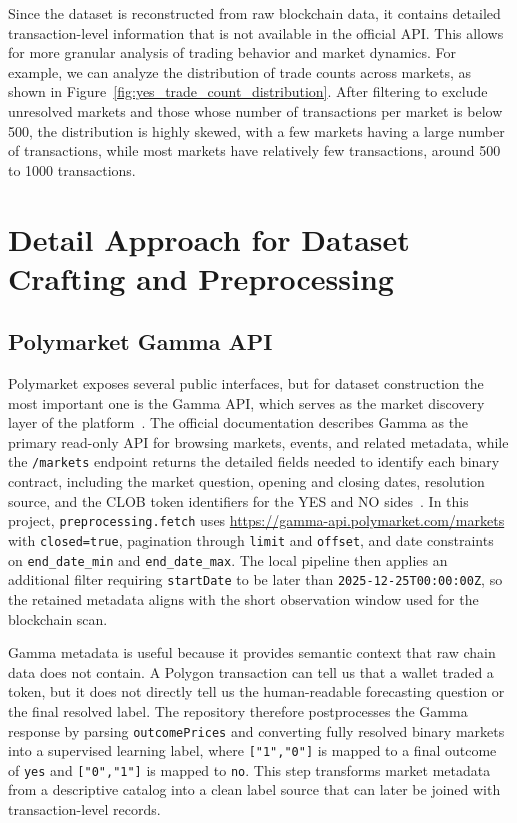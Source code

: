 \documentclass[11pt]{article}
\begin{document}
Since the dataset is reconstructed from raw blockchain data, it contains detailed transaction-level information that is not available in the official API. This allows for more granular analysis of trading behavior and market dynamics. For example, we can analyze the distribution of trade counts across markets, as shown in Figure~\ref{fig:yes_trade_count_distribution}. After filtering to exclude unresolved markets and those whose number of transactions per market is below 500, the distribution is highly skewed, with a few markets having a large number of transactions, while most markets have relatively few transactions, around 500 to 1000 transactions.

\section{Detail Approach for Dataset Crafting and Preprocessing}

\subsection{Polymarket Gamma API}

Polymarket exposes several public interfaces, but for dataset construction the most important one is the Gamma API, which serves as the market discovery layer of the platform~\cite{polymarketApiIntroduction}. The official documentation describes Gamma as the primary read-only API for browsing markets, events, and related metadata, while the \texttt{/markets} endpoint returns the detailed fields needed to identify each binary contract, including the market question, opening and closing dates, resolution source, and the CLOB token identifiers for the YES and NO sides~\cite{polymarketApiIntroduction, polymarketListMarkets}. In this project, \texttt{preprocessing.fetch} uses \url{https://gamma-api.polymarket.com/markets} with \texttt{closed=true}, pagination through \texttt{limit} and \texttt{offset}, and date constraints on \texttt{end\_date\_min} and \texttt{end\_date\_max}. The local pipeline then applies an additional filter requiring \texttt{startDate} to be later than \texttt{2025-12-25T00:00:00Z}, so the retained metadata aligns with the short observation window used for the blockchain scan.

Gamma metadata is useful because it provides semantic context that raw chain data does not contain. A Polygon transaction can tell us that a wallet traded a token, but it does not directly tell us the human-readable forecasting question or the final resolved label. The repository therefore postprocesses the Gamma response by parsing \texttt{outcomePrices} and converting fully resolved binary markets into a supervised learning label, where \texttt{["1","0"]} is mapped to a final outcome of \texttt{yes} and \texttt{["0","1"]} is mapped to \texttt{no}. This step transforms market metadata from a descriptive catalog into a clean label source that can later be joined with transaction-level records.
\end{document}
